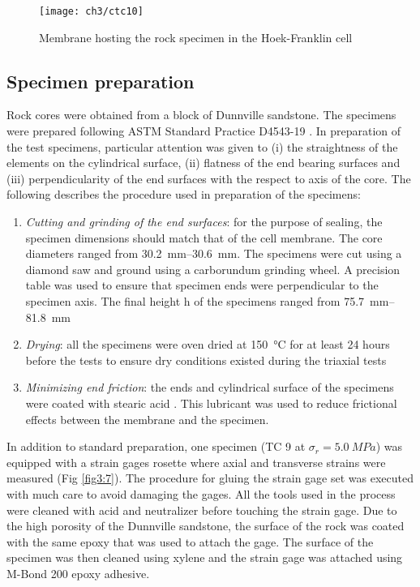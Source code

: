 \begin{figure}[tb]
    \centering
    \texttt{[image: ch3/ctc10]}
    \caption{Membrane hosting the rock specimen in the Hoek-Franklin cell}
    \label{fig3:6}
\end{figure} 

\subsection{Specimen preparation} \label{ch3:specimen-prep}

Rock cores were obtained from a block of Dunnville sandstone. The specimens were prepared following ASTM Standard Practice D4543-19 \cite{ASTM2019}. In preparation of the test specimens, particular attention was given to (i) the straightness of the elements on the cylindrical surface, (ii) flatness of the end bearing surfaces and (iii) perpendicularity of the end surfaces with the respect to axis of the core. The following describes the procedure used in preparation of the specimens:

\begin{enumerate}
    \item \emph{Cutting and grinding of the end surfaces}: for the purpose of sealing, the specimen dimensions should match that of the cell membrane. The core diameters ranged from \SIrange{30.2}{30.6}{mm}. The specimens were cut using a diamond saw and ground using a carborundum grinding wheel. A precision table was used to ensure that specimen ends were perpendicular to the specimen axis. The final height h of the specimens ranged from \SIrange{75.7}{81.8}{mm} 
    \item \emph{Drying}: all the specimens were oven dried at \SI{150}{\celsius} for at least 24 hours before the tests to ensure dry conditions existed during the triaxial tests
    \item \emph{Minimizing end friction}: the ends and cylindrical surface of the specimens were coated with stearic acid \cite{ASTM2019}. This lubricant was used to reduce frictional effects between the membrane and the specimen.
\end{enumerate}

In addition to standard preparation, one specimen (TC 9 at $\sigma_r = \SI{5.0}{MPa}$) was equipped with a strain gages rosette where axial and transverse strains were measured (Fig \ref{fig3:7}). The procedure for gluing the strain gage set was executed with much care to avoid damaging the gages. All the tools used in the process were cleaned with acid and neutralizer before touching the strain gage. Due to the high porosity of the Dunnville sandstone, the surface of the rock was coated with the same epoxy that was used to attach the gage. The surface of the specimen was then cleaned using xylene and the strain gage was attached using M-Bond 200 epoxy adhesive.

